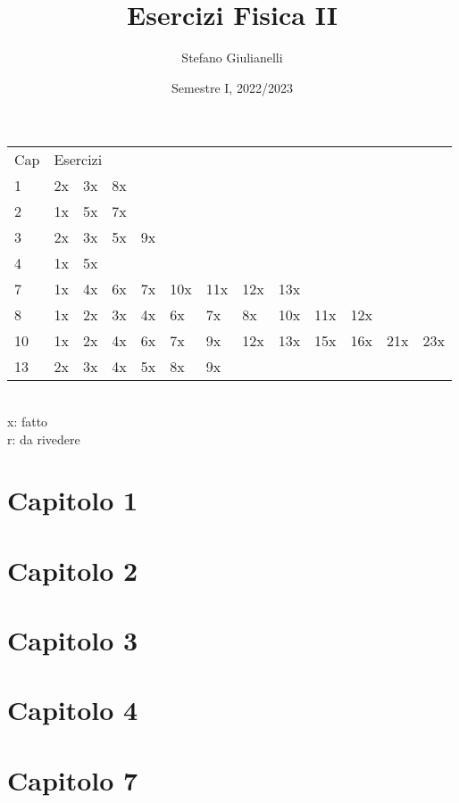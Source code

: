 \documentclass[12pt]{article}
\begin{document}
\author{Stefano Giulianelli}
\title{Esercizi Fisica II}
\date{Semestre I, 2022/2023}
\maketitle{}
\tableofcontents{}
\begin{tabular}{ l l l l l l l l l l l l l }
  Cap & \multicolumn{12}{l}{Esercizi}\\
  1 & 2x & 3x & 8x &&&&&&&&&\\
  2 & 1x & 5x & 7x &&&&&&&&&\\
  3 & 2x & 3x & 5x & 9x &&&&&&&&\\
  4 & 1x & 5x &&&&&&&&&&\\
  7 & 1x & 4x & 6x & 7x & 10x & 11x & 12x & 13x &&&&\\
  8 & 1x & 2x & 3x & 4x & 6x & 7x & 8x & 10x & 11x & 12x &&\\
  10 & 1x & 2x & 4x & 6x & 7x & 9x & 12x & 13x & 15x & 16x & 21x & 23x \\
  13 & 2x & 3x & 4x & 5x & 8x & 9x &&&&&& \\
\end{tabular}
\\x: fatto
\\r: da rivedere
\newpage
{}
\section*{Capitolo 1}



\section*{Capitolo 2}



\section*{Capitolo 3}




\section*{Capitolo 4}


\section*{Capitolo 7}








\end{document}
